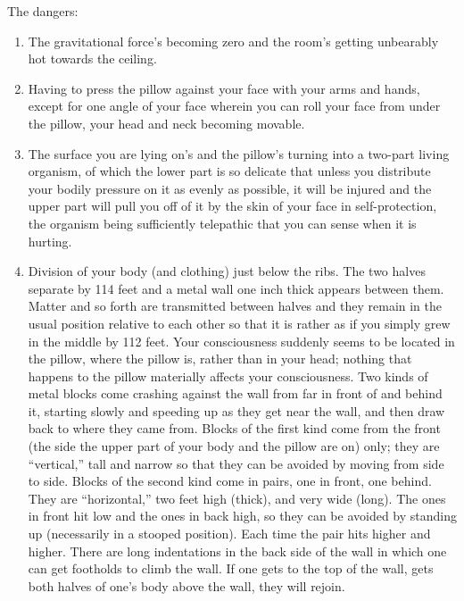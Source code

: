 The dangers: 
\begin{enumerate}
\item The gravitational force's becoming zero and the room's getting 
unbearably hot towards the ceiling. 
\item Having to press the pillow against your face with your arms and hands, 
except for one angle of your face wherein you can roll your face from under 
the pillow, your head and neck becoming movable. 
\item The surface you are lying on's and the pillow's turning into a two-part 
living organism, of which the lower part is so delicate that unless you 
distribute your bodily pressure on it as evenly as possible, it will be injured 
and the upper part will pull you off of it by the skin of your face in 
self-protection, the organism being sufficiently telepathic that you can 
sense when it is hurting. 
\item Division of your body (and clothing) just below the ribs. The two halves 
separate by 114 feet and a metal wall one inch thick appears between them. 
Matter and so forth are transmitted between halves and they remain in the 
usual position relative to each other so that it is rather as if you simply grew 
in the middle by 112 feet. Your consciousness suddenly seems to be located 
in the pillow, where the pillow is, rather than in your head; nothing that 
happens to the pillow materially affects your consciousness. Two kinds of 
metal blocks come crashing against the wall from far in front of and behind 
it, starting slowly and speeding up as they get near the wall, and then draw 
back to where they came from. Blocks of the first kind come from the front 
(the side the upper part of your body and the pillow are on) only; they are 
\enquote{vertical,} tall and narrow so that they can be avoided by moving from side 
to side. Blocks of the second kind come in pairs, one in front, one behind. 
They are \enquote{horizontal,} two feet high (thick), and very wide (long). The ones 
in front hit low and the ones in back high, so they can be avoided by standing 
up (necessarily in a stooped position). Each time the pair hits higher and 
higher. There are long indentations in the back side of the wall in which one 
can get footholds to climb the wall. If one gets to the top of the wall, gets 
both halves of one's body above the wall, they will rejoin. 
\end{enumerate}

